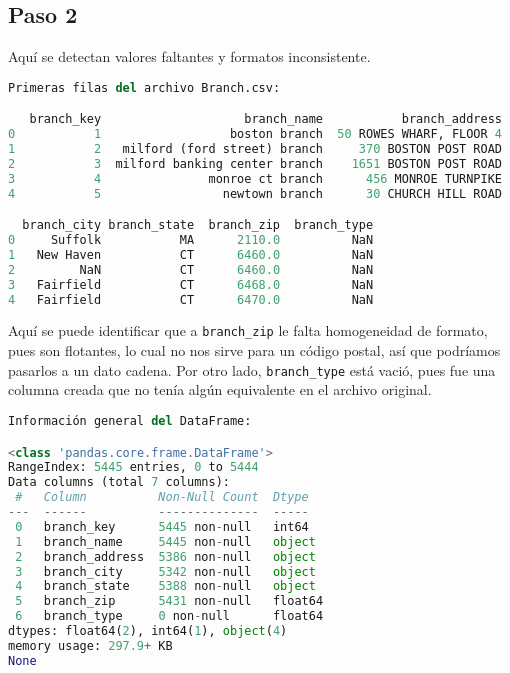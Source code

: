 \vspace{1.5 cm}

\subsection*{Paso 2}

Aquí se detectan valores faltantes y formatos inconsistente.

\vspace{0.5 cm}



\vspace{0.5 cm}

\begin{lstlisting}[language = Python, caption = {Información de los datos.}]
Primeras filas del archivo Branch.csv:

   branch_key                    branch_name           branch_address  \
0           1                  boston branch  50 ROWES WHARF, FLOOR 4   
1           2   milford (ford street) branch     370 BOSTON POST ROAD   
2           3  milford banking center branch    1651 BOSTON POST ROAD   
3           4               monroe ct branch      456 MONROE TURNPIKE   
4           5                 newtown branch      30 CHURCH HILL ROAD   

  branch_city branch_state  branch_zip  branch_type  
0     Suffolk           MA      2110.0          NaN  
1   New Haven           CT      6460.0          NaN  
2         NaN           CT      6460.0          NaN  
3   Fairfield           CT      6468.0          NaN  
4   Fairfield           CT      6470.0          NaN  
\end{lstlisting}

\vspace{0.5 cm}

Aquí se puede identificar que a \texttt{branch\_zip} le falta 
homogeneidad de formato, pues son flotantes, lo cual no nos 
sirve para un código postal, así que podríamos pasarlos a un 
dato cadena. Por otro lado, \texttt{branch\_type} está vació, 
pues fue una columna creada que no tenía algún equivalente 
en el archivo original. 

\vspace{0.5 cm}

\begin{lstlisting}[language = Python, caption = {Información de la tabla.}]
Información general del DataFrame:

<class 'pandas.core.frame.DataFrame'>
RangeIndex: 5445 entries, 0 to 5444
Data columns (total 7 columns):
 #   Column          Non-Null Count  Dtype  
---  ------          --------------  -----  
 0   branch_key      5445 non-null   int64  
 1   branch_name     5445 non-null   object 
 2   branch_address  5386 non-null   object 
 3   branch_city     5342 non-null   object 
 4   branch_state    5388 non-null   object 
 5   branch_zip      5431 non-null   float64
 6   branch_type     0 non-null      float64
dtypes: float64(2), int64(1), object(4)
memory usage: 297.9+ KB
None
\end{lstlisting}

